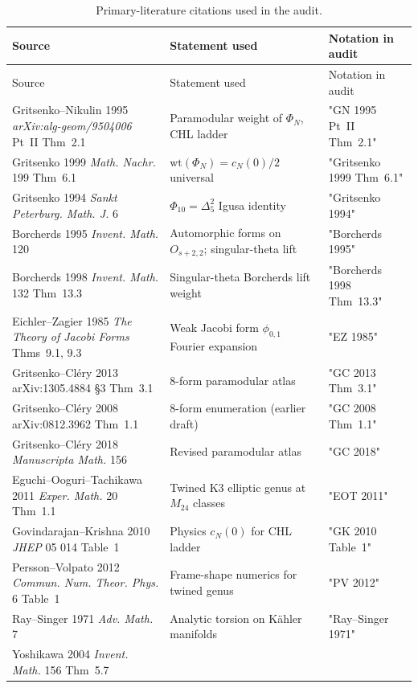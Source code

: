 \documentclass[11pt]{article}
\theoremstyle{definition}
\begin{document}
\begin{longtable}{p{5cm}|p{5cm}|p{4.5cm}}
\caption{Primary-literature citations used in the audit.}
\label{tab:primary-citations} \\
\hline
Source & Statement used & Notation in audit \\
\hline
\endfirsthead
\hline
Source & Statement used & Notation in audit \\
\hline
\endhead
Gritsenko--Nikulin 1995 \emph{arXiv:alg-geom/9504006} Pt~II Thm~2.1 &
Paramodular weight of $\Phi_N$, CHL ladder &
"GN 1995 Pt~II Thm~2.1" \\
\hline
Gritsenko 1999 \emph{Math. Nachr.} 199 Thm~6.1 &
$\mathrm{wt}(\Phi_N) = c_N(0)/2$ universal &
"Gritsenko 1999 Thm~6.1" \\
\hline
Gritsenko 1994 \emph{Sankt Peterburg. Math. J.} 6 &
$\Phi_{10} = \Delta_5^2$ Igusa identity &
"Gritsenko 1994" \\
\hline
Borcherds 1995 \emph{Invent. Math.} 120 &
Automorphic forms on $O_{s+2,2}$; singular-theta lift &
"Borcherds 1995" \\
\hline
Borcherds 1998 \emph{Invent. Math.} 132 Thm~13.3 &
Singular-theta Borcherds lift weight &
"Borcherds 1998 Thm~13.3" \\
\hline
Eichler--Zagier 1985 \emph{The Theory of Jacobi Forms} Thms~9.1, 9.3 &
Weak Jacobi form $\phi_{0,1}$ Fourier expansion &
"EZ 1985" \\
\hline
Gritsenko--Cl\'ery 2013 arXiv:1305.4884 \S 3 Thm~3.1 &
8-form paramodular atlas &
"GC 2013 Thm~3.1" \\
\hline
Gritsenko--Cl\'ery 2008 arXiv:0812.3962 Thm~1.1 &
8-form enumeration (earlier draft) &
"GC 2008 Thm~1.1" \\
\hline
Gritsenko--Cl\'ery 2018 \emph{Manuscripta Math.} 156 &
Revised paramodular atlas &
"GC 2018" \\
\hline
Eguchi--Ooguri--Tachikawa 2011 \emph{Exper. Math.} 20 Thm~1.1 &
Twined K3 elliptic genus at $M_{24}$ classes &
"EOT 2011" \\
\hline
Govindarajan--Krishna 2010 \emph{JHEP} 05 014 Table~1 &
Physics $c_N(0)$ for CHL ladder &
"GK 2010 Table~1" \\
\hline
Persson--Volpato 2012 \emph{Commun. Num. Theor. Phys.} 6 Table~1 &
Frame-shape numerics for twined genus &
"PV 2012" \\
\hline
Ray--Singer 1971 \emph{Adv. Math.} 7 &
Analytic torsion on K\"ahler manifolds &
"Ray--Singer 1971" \\
\hline
Yoshikawa 2004 \emph{Invent. Math.} 156 Thm~5.7 &

\end{longtable}
\end{document}
